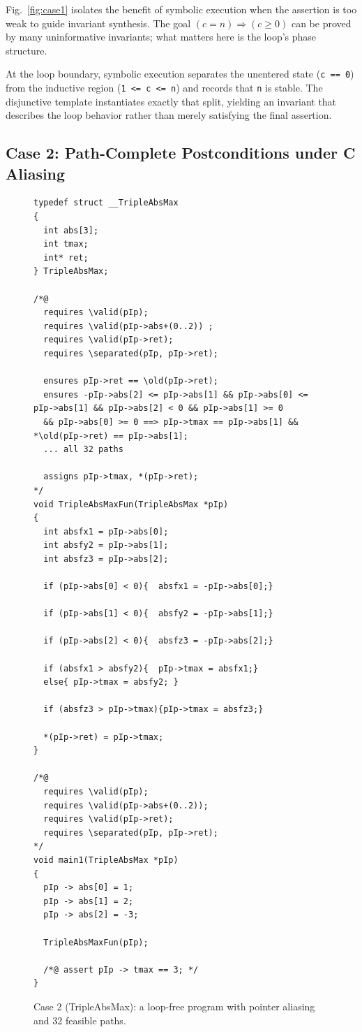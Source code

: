 Fig.~\ref{fig:case1} isolates the benefit of symbolic execution when the assertion is too weak to guide invariant synthesis. The goal $(c = n) \Rightarrow (c \ge 0)$ can be proved by many uninformative invariants; what matters here is the loop's phase structure.

At the loop boundary, symbolic execution separates the unentered state (\texttt{c == 0}) from the inductive region (\texttt{1 <= c <= n}) and records that \texttt{n} is stable. The disjunctive template instantiates exactly that split, yielding an invariant that describes the loop behavior rather than merely satisfying the final assertion.

\subsection{Case 2: Path-Complete Postconditions under C Aliasing}

\begin{figure}[!t]
    \centering
    \begin{tcolorbox}[casebox, title={Case 2: path-complete postconditions under C aliasing}, width=\linewidth]
\begin{lstlisting}[style=casecompactinnerstyle]
typedef struct __TripleAbsMax
{
  int abs[3];
  int tmax;
  int* ret;
} TripleAbsMax;

/*@
  requires \valid(pIp);
  requires \valid(pIp->abs+(0..2)) ;
  requires \valid(pIp->ret);
  requires \separated(pIp, pIp->ret);

  ensures pIp->ret == \old(pIp->ret);
  ensures -pIp->abs[2] <= pIp->abs[1] && pIp->abs[0] <= pIp->abs[1] && pIp->abs[2] < 0 && pIp->abs[1] >= 0
  && pIp->abs[0] >= 0 ==> pIp->tmax == pIp->abs[1] && *\old(pIp->ret) == pIp->abs[1];
  ... all 32 paths

  assigns pIp->tmax, *(pIp->ret);
*/
void TripleAbsMaxFun(TripleAbsMax *pIp)
{
  int absfx1 = pIp->abs[0];
  int absfy2 = pIp->abs[1];
  int absfz3 = pIp->abs[2];

  if (pIp->abs[0] < 0){  absfx1 = -pIp->abs[0];}

  if (pIp->abs[1] < 0){  absfy2 = -pIp->abs[1];}

  if (pIp->abs[2] < 0){  absfz3 = -pIp->abs[2];}

  if (absfx1 > absfy2){  pIp->tmax = absfx1;}
  else{ pIp->tmax = absfy2; }

  if (absfz3 > pIp->tmax){pIp->tmax = absfz3;}

  *(pIp->ret) = pIp->tmax;
}

/*@
  requires \valid(pIp);
  requires \valid(pIp->abs+(0..2));
  requires \valid(pIp->ret);
  requires \separated(pIp, pIp->ret);
*/
void main1(TripleAbsMax *pIp)
{
  pIp -> abs[0] = 1;
  pIp -> abs[1] = 2;
  pIp -> abs[2] = -3;

  TripleAbsMaxFun(pIp);

  /*@ assert pIp -> tmax == 3; */
}
\end{lstlisting}
    \end{tcolorbox}
    \caption{Case 2 (TripleAbsMax): a loop-free program with pointer aliasing and 32 feasible paths.}
    \label{fig:case3}
\end{figure}

